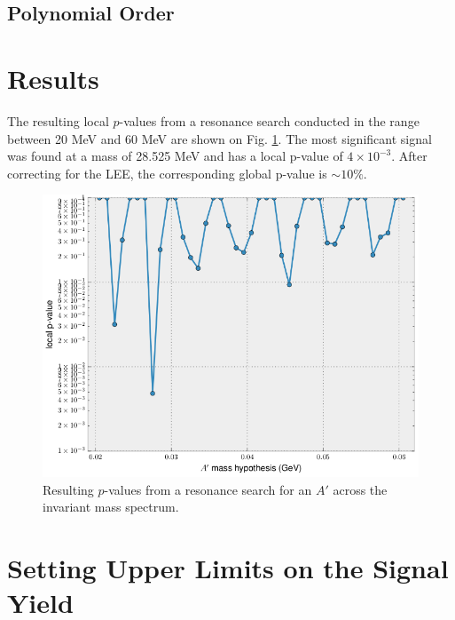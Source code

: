 \subsection{Polynomial Order}

\section{Results}

The resulting local $p$-values from a resonance search conducted in the range 
between 20 MeV and 60 MeV are shown on Fig. \ref{fig:local_p_values}. 
The most significant signal
was found at a mass of 28.525 MeV and has a local p-value of $4 \times 10^{-3}$.
After correcting for the LEE, the corresponding global p-value is 
$\sim 10\%$.
\begin{figure}[t]
    \centering
    \includegraphics[width=\textwidth]{images/final_p_values.png}
    \caption{Resulting $p$-values from a resonance search for an $A'$ across the
    invariant mass spectrum.}
    \label{fig:local_p_values}
\end{figure}

\section{Setting Upper Limits on the Signal Yield}

